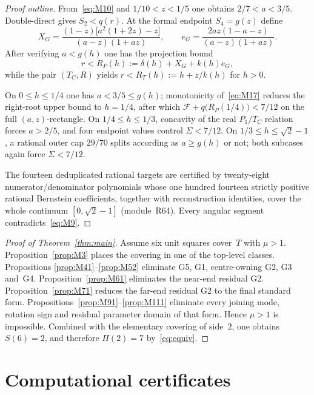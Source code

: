 \documentclass[11pt,reqno]{amsart}
\theoremstyle{definition}
\begin{document}
\begin{proof}[Proof outline]
From~\eqref{eq:M10} and $1/10<z<1/5$ one obtains $2/7<a<3/5$.  Double-direct
gives $S_2<q(r)$.  At the formal endpoint $S_4=g(z)$ define
\begin{equation}\label{eq:M16}
X_G=\frac{(1-z)\bigl[a^2(1+2z)-z\bigr]}{(a-z)(1+az)},\qquad
e_G=\frac{2az(1-a-z)}{(a-z)(1+az)}.
\end{equation}
After verifying $a<g(h)$ one has the projection bound
\begin{equation}\label{eq:M17}
r<R_P(h):=\delta(h)+X_G+k(h)e_G,
\end{equation}
while the pair $(T_C,R)$ yields $r<R_T(h):=h+z/k(h)$ for $h>0$.

On $0\le h\le 1/4$ one has $a<3/5\le g(h)$; monotonicity of~\eqref{eq:M17}
reduces the right-root upper bound to $h=1/4$, after which
$\mathcal F+q\bigl(R_P(1/4)\bigr)<7/12$ on the full $(a,z)$-rectangle.
On $1/4\le h\le 1/3$, concavity of the real $P_1/T_C$ relation forces $a>2/5$,
and four endpoint values control $\Sigma<7/12$.  On
$1/3\le h\le\sqrt2-1$, a rational outer cap $29/70$ splits according as
$a\ge g(h)$ or not; both subcases again force $\Sigma<7/12$.

The fourteen deduplicated rational targets are certified by twenty-eight
numerator/denominator polynomials whose one hundred fourteen strictly positive
rational Bernstein coefficients, together with reconstruction identities, cover
the whole continuum $[0,\sqrt2-1]$ (module~R64).  Every angular segment
contradicts~\eqref{eq:M9}.
\end{proof}

\begin{proof}[Proof of Theorem~\ref{thm:main}]
Assume six unit squares cover~$T$ with $\mu>1$.  Proposition~\ref{prop:M3}
places the covering in one of the top-level classes.  Propositions
\ref{prop:M41}--\ref{prop:M52} eliminate G5, G1, centre-owning G2, G3 and~G4.
Proposition~\ref{prop:M61} eliminates the near-end residual G2.
Proposition~\ref{prop:M71} reduces the far-end residual G2 to the final
standard form.  Propositions~\ref{prop:M91}--\ref{prop:M111} eliminate every
joining mode, rotation sign and residual parameter domain of that form.
Hence $\mu>1$ is impossible.  Combined with the elementary covering of side~$2$,
one obtains $S(6)=2$, and therefore $\Pi(2)=7$ by~\eqref{eq:equiv}.
\end{proof}

\section{Computational certificates}\label{sec:certs}
\end{document}
